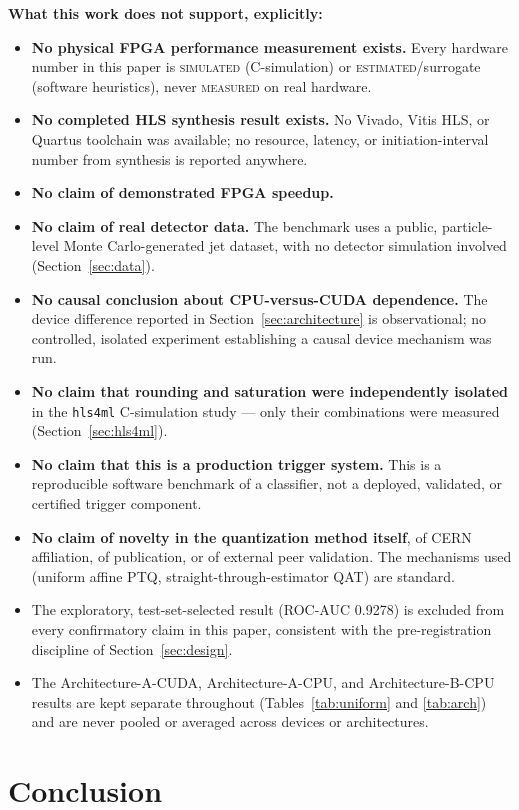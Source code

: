 \documentclass[11pt]{article}
\newcommand{\tierm}{\textsc{measured}}
\newcommand{\tiers}{\textsc{simulated}}
\newcommand{\tiere}{\textsc{estimated}}
\begin{document}
\textbf{What this work does not support, explicitly:}
\begin{itemize}
  \item \textbf{No physical FPGA performance measurement exists.} Every hardware number in this paper
    is \tiers{} (C-simulation) or \tiere{}/surrogate (software heuristics), never \tierm{} on real
    hardware.
  \item \textbf{No completed HLS synthesis result exists.} No Vivado, Vitis HLS, or Quartus toolchain
    was available; no resource, latency, or initiation-interval number from synthesis is reported
    anywhere.
  \item \textbf{No claim of demonstrated FPGA speedup.}
  \item \textbf{No claim of real detector data.} The benchmark uses a public, particle-level Monte
    Carlo-generated jet dataset, with no detector simulation involved (Section~\ref{sec:data}).
  \item \textbf{No causal conclusion about CPU-versus-CUDA dependence.} The device difference reported
    in Section~\ref{sec:architecture} is observational; no controlled, isolated experiment establishing
    a causal device mechanism was run.
  \item \textbf{No claim that rounding and saturation were independently isolated} in the
    \texttt{hls4ml} C-simulation study --- only their combinations were measured
    (Section~\ref{sec:hls4ml}).
  \item \textbf{No claim that this is a production trigger system.} This is a reproducible software
    benchmark of a classifier, not a deployed, validated, or certified trigger component.
  \item \textbf{No claim of novelty in the quantization method itself}, of CERN affiliation, of
    publication, or of external peer validation. The mechanisms used (uniform affine PTQ,
    straight-through-estimator QAT) are standard.
  \item The exploratory, test-set-selected result (ROC-AUC 0.9278) is excluded from every confirmatory
    claim in this paper, consistent with the pre-registration discipline of Section~\ref{sec:design}.
  \item The Architecture-A-CUDA, Architecture-A-CPU, and Architecture-B-CPU results are kept separate
    throughout (Tables~\ref{tab:uniform} and \ref{tab:arch}) and are never pooled or averaged across
    devices or architectures.
\end{itemize}

\section{Conclusion}
\end{document}
